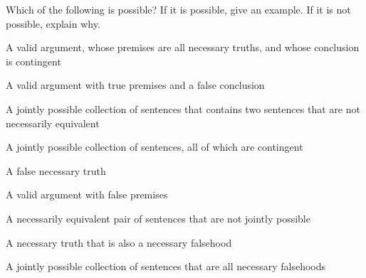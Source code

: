 \problempart
Which of the following is possible? If it is possible, give an example. If it is not possible, explain why.

\begin{compactlist}
\item A valid argument, whose premises are all necessary truths, and whose conclusion is contingent
\item A valid argument with true premises and a false conclusion
\item A jointly possible collection of sentences that contains two sentences that are not necessarily equivalent
\item A jointly possible collection of sentences, all of which are contingent
\item A false necessary truth
\item A valid argument with false premises
\item A necessarily equivalent pair of sentences that are not jointly possible
\item A necessary truth that is also a necessary falsehood
\item A jointly possible collection of sentences that are all necessary falsehoods
\end{compactlist}

